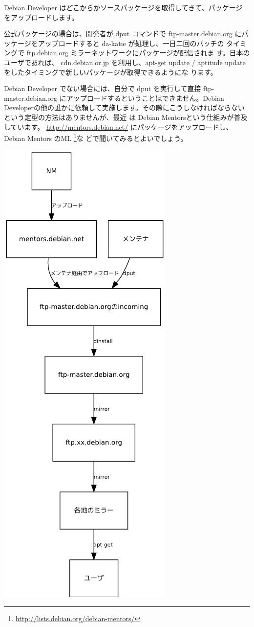 \documentclass[mingoth,a4paper]{jsarticle}
\begin{document}
 Debian Developer はどこからかソースパッケージを取得してきて、パッケージ
 をアップロードします。

 公式パッケージの場合は、開発者が dput コマンドで ftp-master.debian.org 
 にパッケージをアップロードすると da-katie が処理し、一日二回のバッチの
 タイミングで ftp.debian.org ミラーネットワークにパッケージが配信されま
 す。日本のユーザであれば、 cdn.debian.or.jp を利用し、apt-get update /
 aptitude update をしたタイミングで新しいパッケージが取得できるようにな
 ります。

 Debian Developer でない場合には、自分で dput を実行して直接
 ftp-master.debian.org にアップロードするということはできません。Debian
 Developerの他の誰かに依頼して実施します。その際にこうしなければならない
 という定型の方法はありませんが、最近
 は Debian Mentorsという仕組みが普及しています。
 \url{http://mentors.debian.net/} にパッケージをアップロードし、Debian
 Mentors のML \footnote{\url{http://lists.debian.org/debian-mentors/}}な
 どで聞いてみるとよいでしょう。

 \includegraphics[height=0.8\vsize]{image200801/maint-package.png}
\end{document}
